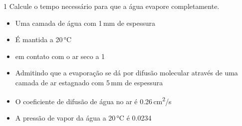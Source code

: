 \documentclass[\mainfilename]{subfiles}
\begin{document}
\begin{exampleBox}1{
    Calcule o tempo necessário para que a água evapore completamente.
} %
    
    \begin{itemize}
        \item Uma camada de água com 1\,\unit{\milli\metre} de espessura
        \item É mantida a 20\,\unit{\celsius}
        \item em contato com o ar seco a 1\,\unit{\atm}
        \item Admitindo que a evaporação  se dá por difusão molecular através de uma camada de ar estagnado com 5\,\unit{\milli\metre} de espessura
        \item O coeficiente de difusão de água no ar é 0.26\,\unit{\centi\metre^2/\second}
        \item A pressão de vapor da água a 20\,\unit{\celsius} é 0.0234\,\unit{\atm}
    \end{itemize}


\end{exampleBox}
\end{document}
